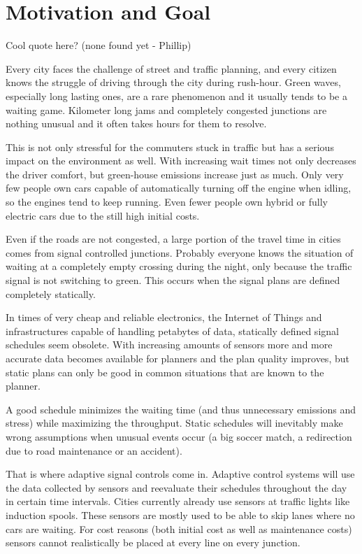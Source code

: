 \section{Motivation and Goal}

Cool quote here? (none found yet - Phillip)

Every city faces the challenge of street and traffic planning, and every citizen knows the struggle of driving through the city during rush-hour. Green waves, especially long lasting ones, are a rare phenomenon and it usually tends to be a waiting game. Kilometer long jams and completely congested junctions are nothing unusual and it often takes hours for them to resolve.

This is not only stressful for the commuters stuck in traffic but has a serious impact on the environment as well.
With increasing wait times not only decreases the driver comfort, but green-house emissions increase just as much. Only very few people own cars capable of automatically turning off the engine when idling, so the engines tend to keep running. Even fewer people own hybrid or fully electric cars due to the still high initial costs.

Even if the roads are not congested, a large portion of the travel time in cities comes from signal controlled junctions. Probably everyone knows the situation of waiting at a completely empty crossing during the night, only because the traffic signal is not switching to green.
This occurs when the signal plans are defined completely statically.

In times of very cheap and reliable electronics, the Internet of Things and infrastructures capable of handling petabytes of data, statically defined signal schedules seem obsolete.
With increasing amounts of sensors more and more accurate data becomes available for planners and the plan quality improves, but static plans can only be good in common situations that are known to the planner.

A good schedule minimizes the waiting time (and thus unnecessary emissions and stress) while maximizing the throughput. Static schedules will inevitably make wrong assumptions when unusual events occur (a big soccer match, a redirection due to road maintenance or an accident).

That is where adaptive signal controls come in. Adaptive control systems will use the data collected by sensors and reevaluate their schedules throughout the day in certain time intervals.
Cities currently already use sensors at traffic lights like induction spools.
These sensors are mostly used to be able to skip lanes where no cars are waiting. For cost reasons (both initial cost as well as maintenance costs) sensors cannot realistically be placed at every line on every junction.

